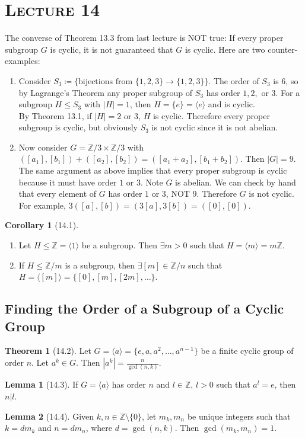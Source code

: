 \documentclass{article}
\newcommand{\Z}{\mathbb{Z}}
\newcommand{\coleq}{\coloneqq}
\newcommand{\gen}[1]{\langle#1\rangle}
\theoremstyle{definition}
\newtheorem*{cor}{Corollary}
\newtheorem*{thm}{Theorem}
\newtheorem*{lem}{Lemma}
\theoremstyle{remark}
\begin{document}
    \noindent\section*{\textbf{\textsc{Lecture 14}}}{
        The converse of Theorem 13.3 from last lecture is NOT true: If every proper subgroup $G$ is cyclic, it is not guaranteed that $G$ is cyclic. Here are two counter-examples:
        \begin{enumerate}
            \item Consider $S_3\coleq \{\text{bijections from }\{1,2,3\}\to \{1,2,3\}\}$. The order of $S_3$ is $6$, so by Lagrange's Theorem any proper subgroup of $S_3$ has order $1,2,$ or $3$. For a subgroup $H \leq S_3$ with $|H|=1$, then $H=\{e\}=\gen{e}$ and is cyclic.\\
            By Theorem 13.1, if $|H|=2$ or $3$, $H$ is cyclic. Therefore every proper subgroup is cyclic, but obviously $S_3$ is not cyclic since it is not abelian.
            \item Now consider $G=\Z/3\times \Z/3$ with $([a_1],[b_1])+([a_2],[b_2])=([a_1+a_2],[b_1+b_2])$. Then $|G|=9$. The same argument as above implies that every proper subgroup is cyclic because it must have order $1$ or $3$. Note $G$ is abelian. We can check by hand that every element of $G$ has order $1$ or $3$, NOT $9$. Therefore $G$ is not cyclic. For example, $3([a],[b])=(3[a],3[b])=([0],[0])$.
        \end{enumerate}
        
        \begin{cor}[14.1]\hfill
            \begin{enumerate}
                \item Let $H\leq \Z=\gen{1}$ be a subgroup. Then $\exists m>0$ such that $H=\gen{m}=m\Z$.
                \item If $H\leq \Z/m$ is a subgroup, then $\exists[m] \in \Z/n$ such that $H=\gen{[m]}=\{[0],[m],[2m],\ldots\}$.
            \end{enumerate}
        \end{cor}
        \subsection*{Finding the Order of a Subgroup of a Cyclic Group}{
            \begin{thm}[14.2]
                Let $G=\gen{a}=\{e,a,a^2,\ldots,a^{n-1}\}$ be a finite cyclic group of order $n$. Let $a^k\in G$. Then $|a^k|=\frac{n}{\gcd(n,k)}$.
            \end{thm}
            
            \begin{lem}[14.3]
                If $G=\gen{a}$ has order $n$ and $l \in \Z, \, l>0$ such that $a^l=e$, then $n|l$.
            \end{lem}
            
            \begin{lem}[14.4]
                Given $k,n \in \Z\setminus\{0\}$, let $m_k,m_n$ be unique integers such that $k=dm_k$ and $n=dm_n$, where $d=\gcd(n,k)$. Then $\gcd(m_k,m_n)=1$.
            \end{lem}
        }
    }
\end{document}
